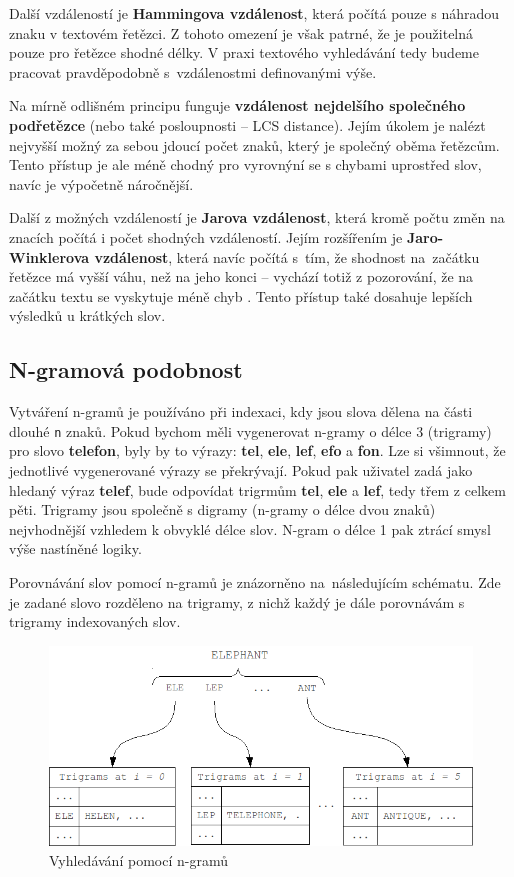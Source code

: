 \documentclass[FM,DP]{tulthesis}
\begin{document}
Další vzdáleností je \textbf{Hammingova vzdálenost}, která počítá pouze s náhradou
znaku v textovém řetězci. Z tohoto omezení je však patrné, že je použitelná pouze pro 
řetězce shodné délky. V praxi textového vyhledávání tedy budeme pracovat pravděpodobně
s~vzdálenostmi definovanými výše.

Na mírně odlišném principu funguje \textbf{vzdálenost nejdelšího společného podřetězce}
(nebo také posloupnosti -- LCS distance). Jejím úkolem je nalézt nejvyšší možný za sebou
jdoucí počet znaků, který je společný oběma řetězcům. Tento přístup je ale méně
chodný pro vyrovnýní se s chybami uprostřed slov, navíc je výpočetně náročnější.

Další z možných vzdáleností je \textbf{Jarova vzdálenost}, která kromě počtu
změn na znacích počítá i počet shodných vzdáleností. Jejím rozšířením je
\textbf{Jaro-Winklerova vzdálenost}, která navíc počítá s~tím, že shodnost 
na~začátku řetězce má vyšší váhu, než na jeho konci -- vychází
totiž z pozorování, že na začátku textu se vyskytuje méně chyb \cite{christen}.
Tento přístup také dosahuje lepších výsledků u krátkých slov.

\subsection{N-gramová podobnost}

Vytváření n-gramů je používáno při indexaci, kdy jsou slova dělena na části dlouhé \verb|n| znaků.
Pokud bychom měli vygenerovat n-gramy o délce 3 (trigramy) pro slovo \textbf{telefon}, byly by 
to výrazy: \textbf{tel}, \textbf{ele}, \textbf{lef}, \textbf{efo} a \textbf{fon}. Lze si 
všimnout, že jednotlivé vygenerované výrazy se překrývají. Pokud pak uživatel zadá jako hledaný 
výraz \textbf{telef}, bude odpovídat trigrmům \textbf{tel}, \textbf{ele} a \textbf{lef}, 
tedy třem z celkem pěti. Trigramy jsou společně s digramy (n-gramy o délce dvou znaků) nejvhodnější
vzhledem k obvyklé délce slov. N-gram o délce 1 pak ztrácí smysl výše nastíněné logiky.

Porovnávání slov pomocí n-gramů je znázorněno na~následujícím schématu. Zde je zadané slovo
rozděleno na trigramy, z nichž každý je dále porovnávám s trigramy indexovaných slov.

\begin{figure}[h]
\center
\includegraphics[width=\textwidth]{n-gram.png}
\caption{Vyhledávání pomocí n-gramů}
\label{n-gram}
\end{figure}
\end{document}
